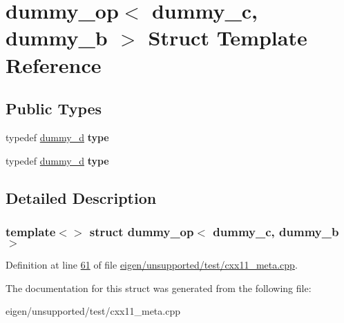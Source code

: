 \hypertarget{structdummy__op_3_01dummy__c_00_01dummy__b_01_4}{}\section{dummy\+\_\+op$<$ dummy\+\_\+c, dummy\+\_\+b $>$ Struct Template Reference}
\label{structdummy__op_3_01dummy__c_00_01dummy__b_01_4}
\subsection*{Public Types}
\begin{DoxyCompactItemize}
\item 
\mbox{\label{structdummy__op_3_01dummy__c_00_01dummy__b_01_4_afe516497343a1538d3b767be7dd6aaa5}} 
typedef \hyperlink{structdummy__d}{dummy\+\_\+d} {\bfseries type}
\item 
\mbox{\label{structdummy__op_3_01dummy__c_00_01dummy__b_01_4_afe516497343a1538d3b767be7dd6aaa5}} 
typedef \hyperlink{structdummy__d}{dummy\+\_\+d} {\bfseries type}
\end{DoxyCompactItemize}


\subsection{Detailed Description}
\subsubsection*{template$<$$>$\newline
struct dummy\+\_\+op$<$ dummy\+\_\+c, dummy\+\_\+b $>$}



Definition at line \hyperlink{eigen_2unsupported_2test_2cxx11__meta_8cpp_source_l00061}{61} of file \hyperlink{eigen_2unsupported_2test_2cxx11__meta_8cpp_source}{eigen/unsupported/test/cxx11\+\_\+meta.\+cpp}.



The documentation for this struct was generated from the following file\+:\begin{DoxyCompactItemize}
\item 
eigen/unsupported/test/cxx11\+\_\+meta.\+cpp\end{DoxyCompactItemize}
